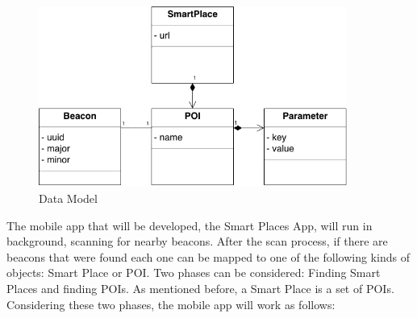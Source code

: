 \begin{figure}[!ht]
  \centering
    \includegraphics[width=0.9\textwidth]{img/smart-places-uml}
    \caption{Data Model}
    \label{fig:uml}
\end{figure}


The mobile app that will be developed, 
the Smart Places App, will run in background,
scanning for nearby beacons. After the scan process,
if there are beacons that were found each one
can be mapped to one of the following kinds of
objects: Smart Place or POI.
Two phases can be considered: Finding Smart Places
and finding POIs.
As mentioned before, a Smart Place is a set of
POIs. Considering these two phases, the mobile app
will work as follows:

